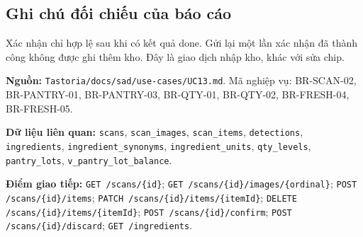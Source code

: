 \subsection{Ghi chú đối chiếu của báo cáo}
Xác nhận chỉ hợp lệ sau khi có kết quả done. Gửi lại một lần xác nhận đã thành công không được ghi thêm kho. Đây là giao dịch nhập kho, khác với sửa chip.

\textbf{Nguồn:} {\small\texttt{Tastoria/\allowbreak{}\allowbreak{}docs/\allowbreak{}\allowbreak{}sad/\allowbreak{}\allowbreak{}use-\allowbreak{}cases/\allowbreak{}\allowbreak{}UC13.\allowbreak{}md}}. Mã nghiệp vụ: BR-\allowbreak{}SCAN-\allowbreak{}02, BR-\allowbreak{}PANTRY-\allowbreak{}01, BR-\allowbreak{}PANTRY-\allowbreak{}03, BR-\allowbreak{}QTY-\allowbreak{}01, BR-\allowbreak{}QTY-\allowbreak{}02, BR-\allowbreak{}FRESH-\allowbreak{}04, BR-\allowbreak{}FRESH-\allowbreak{}05.

\textbf{Dữ liệu liên quan:} {\small\texttt{scans}}, {\small\texttt{scan\_\allowbreak{}\allowbreak{}images}}, {\small\texttt{scan\_\allowbreak{}\allowbreak{}items}}, {\small\texttt{detections}}, {\small\texttt{ingredients}}, {\small\texttt{ingredient\_\allowbreak{}\allowbreak{}synonyms}}, {\small\texttt{ingredient\_\allowbreak{}\allowbreak{}units}}, {\small\texttt{qty\_\allowbreak{}\allowbreak{}levels}}, {\small\texttt{pantry\_\allowbreak{}\allowbreak{}lots}}, {\small\texttt{v\_\allowbreak{}\allowbreak{}pantry\_\allowbreak{}\allowbreak{}lot\_\allowbreak{}\allowbreak{}balance}}.

\textbf{Điểm giao tiếp:} {\small\texttt{GET /\allowbreak{}\allowbreak{}scans/\allowbreak{}\allowbreak{}\{id\}}}; {\small\texttt{GET /\allowbreak{}\allowbreak{}scans/\allowbreak{}\allowbreak{}\{id\}/\allowbreak{}\allowbreak{}images/\allowbreak{}\allowbreak{}\{ordinal\}}}; {\small\texttt{POST /\allowbreak{}\allowbreak{}scans/\allowbreak{}\allowbreak{}\{id\}/\allowbreak{}\allowbreak{}items}}; {\small\texttt{PATCH /\allowbreak{}\allowbreak{}scans/\allowbreak{}\allowbreak{}\{id\}/\allowbreak{}\allowbreak{}items/\allowbreak{}\allowbreak{}\{itemId\}}}; {\small\texttt{DELETE /\allowbreak{}\allowbreak{}scans/\allowbreak{}\allowbreak{}\{id\}/\allowbreak{}\allowbreak{}items/\allowbreak{}\allowbreak{}\{itemId\}}}; {\small\texttt{POST /\allowbreak{}\allowbreak{}scans/\allowbreak{}\allowbreak{}\{id\}/\allowbreak{}\allowbreak{}confirm}}; {\small\texttt{POST /\allowbreak{}\allowbreak{}scans/\allowbreak{}\allowbreak{}\{id\}/\allowbreak{}\allowbreak{}discard}}; {\small\texttt{GET /\allowbreak{}\allowbreak{}ingredients}}.

